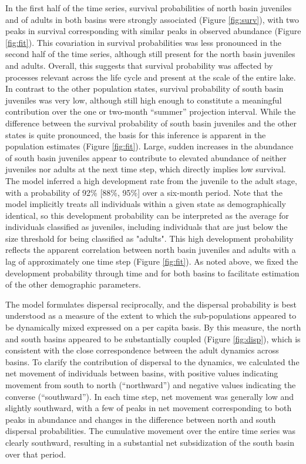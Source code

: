 In the first half of the time series, 
survival probabilities of north basin juveniles and of adults in both basins were strongly
associated (Figure \ref{fig:surv}), 
with two peaks in survival corresponding with similar peaks in observed abundance 
(Figure \ref{fig:fit}).
This covariation in survival probabilities was less pronounced in the second half 
of the time series, although still present for the north basin juveniles and adults.
Overall, this suggests that survival probability was affected by processes relevant across 
the life cycle and present at the scale of the entire lake.
In contrast to the other population states, 
survival probability of south basin juveniles was very low,
although still high enough to constitute a meaningful contribution over the one or two-month
``summer'' projection interval.
While the difference between the survival probability of south basin juveniles and 
the other states is quite pronounced, 
the basis for this inference is apparent 
in the population estimates (Figure \ref{fig:fit}). 
Large, sudden increases in the abundance of south basin juveniles appear to contribute
to elevated abundance of neither juveniles nor adults at the next time step,
which directly implies low survival.
The model inferred a high development rate from the juvenile to the adult stage,
with a probability of 92\% [88\%, 95\%] over a six-month period. 
Note that the model implicitly treats all individuals within a given state 
as demographically identical,
so this development probability can be interpreted as the average 
for individuals classified as juveniles, 
including individuals that are just below the size threshold for being classified as "adults".
This high development probability reflects the apparent correlation between north basin
juveniles and adults with a lag of approximately one time step (Figure \ref{fig:fit}).
As noted above, we fixed the development probability through time and for both basins
to facilitate estimation of the other demographic parameters.

The model formulates dispersal reciprocally,
and the dispersal probability is best understood as a measure of the extent 
to which the sub-populations appeared to be dynamically mixed
expressed on a per capita basis.
By this measure, the north and south basins appeared 
to be substantially coupled (Figure \ref{fig:disp}), 
which is consistent with the close correspondence 
between the adult dynamics across basins.
To clarify the contribution of dispersal to the dynamics, 
we calculated the net movement of individuals between basins,
with positive values indicating movement from south to north (``northward'')
and negative values indicating the converse (``southward'').
In each time step, 
net movement was generally low and slightly southward,
with a few of peaks in net movement corresponding to 
both peaks in abundance
and changes in the difference between north and south dispersal probabilities.
The cumulative movement over the entire time series was clearly southward,
resulting in a substantial net subsidization of the south basin over that period.



